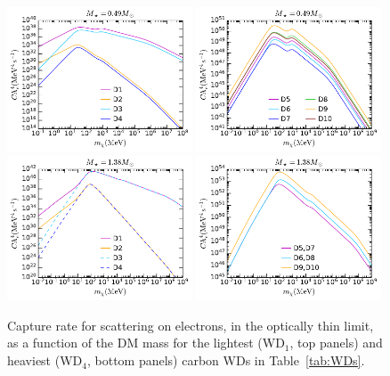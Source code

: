 \begin{figure}
    \centering
    \includegraphics[width=0.49\textwidth]{wd_capture/C_mdm_optthin_e_0.49Msun_D1-D4.pdf}
    \includegraphics[width=0.49\textwidth]{wd_capture/C_mdm_optthin_e_0.49Msun_D5-D10.pdf} \\    
    \includegraphics[width=0.49\textwidth]{wd_capture/C_mdm_optthin_e_1.38Msun_D1-D4.pdf}
    \includegraphics[width=0.49\textwidth]{wd_capture/C_mdm_optthin_e_1.38Msun_D5-D10.pdf} \caption{
 Capture rate for scattering on electrons, in the optically thin limit, as a function of the DM mass for  the lightest (WD$_1$, top panels) and heaviest (WD$_4$, bottom panels)  
 carbon WDs in Table~\ref{tab:WDs}.}
    \label{ch4:fig:Coptthinelec}
\end{figure}

